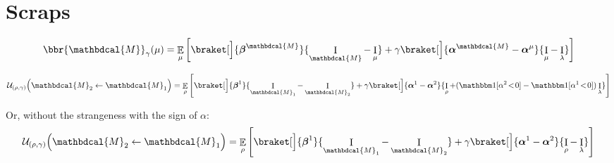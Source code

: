 \documentclass[twoside]{article} %
\theoremstyle{plain}
\theoremstyle{definition}
\DeclareMathOperator{\I}{\mathrm{I}} %
\DeclareMathOperator*{\Ex}{\mathbb{E}} %
\newcommand{\balpha}{\boldsymbol\alpha}
\newcommand{\bbeta}{\boldsymbol\beta}
\newcommand{\dg}[1]{\mathbdcal{#1}}
\begin{document}
\section{Scraps}

\begin{align*}
   \bbr{\dg M}_\gamma(\mu) =
   \Ex_{\mu}\left[
       \braket[\Big]{\bbeta^{\dg M}}{\I_{\dg M}- \I_{\mu}}
       + \gamma
       \braket[\Big]{\balpha^{\dg M} - \balpha^{\mu}} {\I_\mu - \I_\lambda}
   \right]
\end{align*}

\[
\mathcal U_{(\rho, \gamma)}\Big(\dg M_2 \gets \dg M_1 \Big)  =
   \Ex_{\rho}\left[
       \braket[\Big]{\bbeta^{1}}{\I_{\dg M_1}- \I_{\dg M_2}}
       + \gamma
       \braket[\Big]{\balpha^{1} - \balpha^{2}} {\I_\rho + (\mathbbm1[\alpha^2 \!<\!0] - \mathbbm1[\alpha^1\!<\!0])\I_\lambda}
   \right]
\]

Or, without the strangeness with the sign of $\alpha$:
\[
\mathcal U_{(\rho, \gamma)}\Big(\dg M_2 \gets \dg M_1 \Big)  =
   \Ex_{\rho}\left[
       \braket[\Big]{\bbeta^{1}}{\I_{\dg M_1}- \I_{\dg M_2}}
       + \gamma
       \braket[\Big]{\balpha^{1} - \balpha^{2}} {\I_\rho - \I_\lambda}
   \right]
\]
\end{document}
